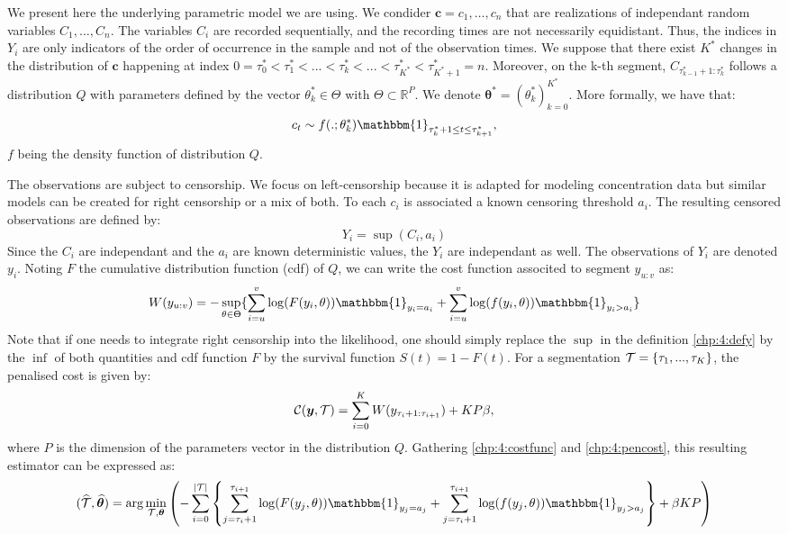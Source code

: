 We present here the underlying parametric model we are using. We condider $\bm c = c_1,\dots,c_n$ that are realizations of independant random variables $C_1,\dots,C_n$. The variables $C_i$ are recorded sequentially, and the recording times are not necessarily equidistant. Thus, the indices in $Y_i$ are only indicators of the order of occurrence in the sample and not of the observation times. We suppose that there exist $K^*$ changes in the distribution of $\bm c$ happening at index $0=\tau_0^*<\tau^*_1 <... < \tau^*_k <... < \tau^*_{K^*}<\tau^*_{K^*+1}=n$. Moreover, on the k-th segment, $C_{\tau^*_{k-1}+1:\tau^*_{k}}$ follows a distribution $Q$ with parameters defined by the vector $\theta^*_k\in\Theta$ with $\Theta\subset\mathbb{R}^P$. We denote $\bm{\theta^*} = (\theta^*_k)_{k=0}^{K^*}$. More formally, we have that:  
$$c_t \sim f(.;\theta^*_k)\mathbbm{1}_{\tau^*_{k}+1\leq t \leq \tau^*_{k+1}},$$
$f$ being the density function of distribution $Q$.  


The observations are subject to censorship. We focus on left-censorship because it is adapted for modeling concentration data but similar models can be created for right censorship or a mix of both. To each $c_i$ is associated a known censoring threshold $a_i$. The resulting censored observations are defined by:  
\begin{equation}\label{chp:4:defy}
Y_i = \sup(C_i,a_i)
\end{equation}
Since the $C_i$ are independant and the $a_i$ are known deterministic values, the $Y_i$ are independant as well. The observations of $Y_i$ are denoted $y_i$. Noting $F$ the cumulative distribution function (cdf) of $Q$, we can write the cost function associted to segment $y_{u:v}$ as:  
\begin{equation}\label{chp:4:costfunc}
W(y_{u:v}) = -\sup_{\theta \in \Theta}\{\sum_{i=u}^v\log(F(y_i,\theta))\mathbbm{1}_{y_i=a_i}+\sum_{i=u}^v\log(f(y_i,\theta))\mathbbm{1}_{y_i>a_i}\}
\end{equation}
Note that if one needs to integrate right censorship into the likelihood, one should simply replace the $\sup$ in the definition \ref{chp:4:defy} by the $\inf$ of both quantities and cdf function $F$ by the survival function $S(t)=1-F(t)$. 
For a segmentation ${\mathcal T} = \{\tau_1,...,\tau_K\}$, the penalised cost is given by: 
\begin{equation}\label{chp:4:pencost}
{\mathcal C}(\bm y,{\mathcal T})=\sum_{i=0}^{K}  W(y_{\tau_i+1:\tau_{i+1}}) + KP\beta,
\end{equation}
where $P$ is the dimension of the parameters vector in the distribution $Q$. Gathering \ref{chp:4:costfunc} and \ref{chp:4:pencost}, this resulting estimator can be expressed as:  
\begin{equation}\label{chp:4:estim}
(\widehat{\TT},\widehat{\bm \theta}) = \arg\min_{\TT,\bm \theta} \left(- \sum_{i=0}^{\lvert \TT \rvert}  \left\{\sum_{j=\tau_i+1}^{\tau_{i+1}}\log(F(y_j,\theta))\mathbbm{1}_{y_j=a_j}+\sum_{j=\tau_i+1}^{\tau_{i+1}}\log(f(y_j,\theta))\mathbbm{1}_{y_j>a_j}\right\}+\beta KP\right)
\end{equation}

